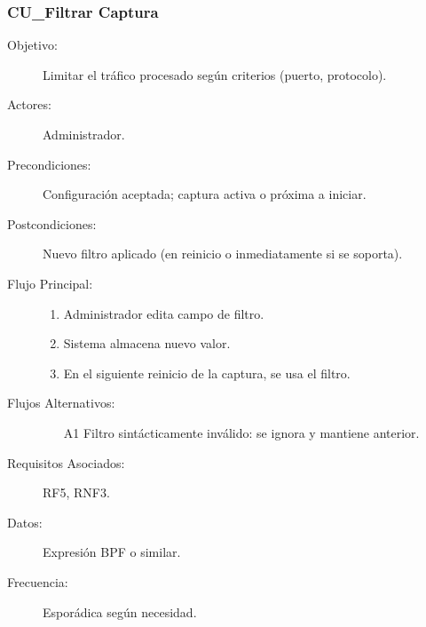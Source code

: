 \subsubsection{CU\_Filtrar Captura}
\begin{description}
  \item[Objetivo:] Limitar el tráfico procesado según criterios (puerto, protocolo).
  \item[Actores:] Administrador.
  \item[Precondiciones:] Configuración aceptada; captura activa o próxima a iniciar.
  \item[Postcondiciones:] Nuevo filtro aplicado (en reinicio o inmediatamente si se soporta).
  \item[Flujo Principal:]
    \begin{enumerate}
      \item Administrador edita campo de filtro.
      \item Sistema almacena nuevo valor.
      \item En el siguiente reinicio de la captura, se usa el filtro.
    \end{enumerate}
  \item[Flujos Alternativos:]
    \begin{enumerate}
      \item[A1] Filtro sintácticamente inválido: se ignora y mantiene anterior.
    \end{enumerate}
  \item[Requisitos Asociados:] RF5, RNF3.
  \item[Datos:] Expresión BPF o similar.
  \item[Frecuencia:] Esporádica según necesidad.
\end{description}

